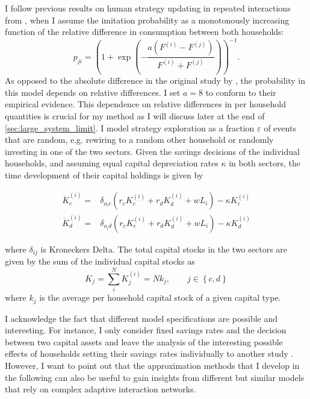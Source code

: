 I follow previous results on human strategy updating in repeated interactions from \cite{Traulsen2010}, when I assume the imitation probability as a monotonously increasing function of the relative difference in consumption between both households:
\begin{equation}
	p_{ji} =  \left(1 + \exp \left(- \frac{a(F^{(i)} - F^{(j)})}{F^{(i)} + F^{(j)}} \right) \right)^{-1}.
    \label{eq:approx_ip}
\end{equation}
As opposed to the absolute difference in the original study by \cite{Traulsen2010}, the probability in this model depends on relative differences. 
I set $a = 8$ to conform to their empirical evidence. This dependence on relative differences in per household quantities is crucial for my method as I will discuss later at the end of \cref{sec:large_system_limit}.
I model strategy exploration as a fraction $\varepsilon$ of events that are random, e.g. rewiring to a random other household or randomly investing in one of the two sectors.
Given the savings decisions of the individual households, and assuming equal capital depreciation rates $\kappa$ in both sectors, the time development of their capital holdings is given by

\begin{align}
	\dot{K}_c^{(i)} =& \delta_{o_ic} \left( r_c K_c^{(i)} + r_d K_d^{(i)} + w L_i \right) - \kappa K_c^{(i)} \label{eq:approx_ci}\\
	\dot{K}_d^{(i)} =& \delta_{o_id} \left( r_c K_c^{(i)} + r_d K_d^{(i)} + w L_i \right) - \kappa K_d^{(i)} \label{eq:approx_di}
\end{align}

where $\delta_{ij}$ is Kroneckers Delta. The total capital stocks in the two sectors are given by the sum of the individual capital stocks as
\begin{equation}
    K_j = \sum_i^N K_j^{(i)} = N k_j, \qquad j \in \left\{ c, d \right\}
\end{equation}
where $k_j$ is the average per household capital stock of a given capital type.

I acknowledge the fact that different model specifications are possible and interesting.
For instance, I only consider fixed savings rates and the decision between two capital assets and leave the analysis of the interesting possible effects of households setting their savings rates individually to another study \citep{Asano2019}.
However, I want to point out that the approximation methods that I develop in the following can also be useful to gain insights from different but similar models that rely on complex adaptive interaction networks.


